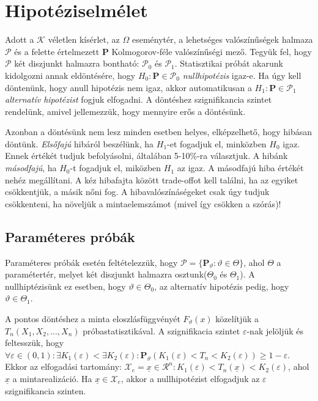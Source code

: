 \chapter{Hipotéziselmélet}

Adott a $\mathcal{K}$ véletlen kísérlet, az $\Omega$ eseménytér,  a lehetséges valószínűségek halmaza $\mathcal{P}$ és a felette értelmezett $\mathbf{P}$ Kolmogorov-féle valószínűségi mező. Tegyük fel, hogy $\mathcal{P}$ két diszjunkt halmazra bontható: $\mathcal{P}_0$ és $\mathcal{P}_1$. Statisztikai próbát akarunk kidolgozni annak eldöntésére, hogy $H_0:\mathbf{P}\in\mathcal{P}_0$ \emph{nullhipotézis} igaz-e. Ha úgy kell döntenünk, hogy anull hipotézis nem igaz, akkor automatikusan a $H_1:\mathbf{P}\in\mathcal{P}_1$ \emph{alternatív hipotézist} fogjuk elfogadni. A döntéshez szignifikancia szintet rendelünk, amivel jellemezzük, hogy mennyire erős a döntésünk.

Azonban a döntésünk nem lesz minden esetben helyes, elképzelhető, hogy hibásan döntünk. \emph{Elsőfajú} hibáról beszélünk, ha $H_1$-et fogadjuk el, minközben $H_0$ igaz. Ennek értékét tudjuk befolyásolni, általában 5-10\%-ra választjuk. A hibánk \emph{másodfajú}, ha $H_0$-t fogadjuk el, miközben $H_1$ az igaz. A másodfajú hiba értékét nehéz megállítani. A kéz hibafajta között trade-offot kell találni, ha az egyiket csökkentjük, a másik nőni fog. A hibavalószínáségeket csak úgy tudjuk csökkenteni, ha növeljük a mintaelemszámot (mivel így csökken a szórás)!

\section{Paraméteres próbák}

Paraméteres próbák esetén feltételezzük, hogy $\mathcal{P} = \{\mathbf{P}_\vartheta:\vartheta \in \Theta\}$, ahol $\Theta$ a paramétertér, melyet két diszjunkt halmazra osztunk($\Theta_0$ és $\Theta_1$). A nullhiptézisünk ez esetben, hogy $\vartheta \in \Theta_0$, az alternatív hipotézis pedig, hogy $\vartheta \in \Theta_1$.

A pontos döntéshez  a minta eloszlásfüggvényét $F_\vartheta(x)$ közelítjük a $T_n(X_1,X_2,...,X_n)$ próbastatisztikával. A szignifikacia szintet $\varepsilon$-nak jelöljük és feltesszük, hogy $\forall \varepsilon \in (0,1): \exists K_1(\varepsilon) < \exists K_2(\varepsilon): \mathbf{P}_\vartheta(K_1(\varepsilon) < T_n <K_2(\varepsilon)) \geq 1-\varepsilon$. Ekkor az elfogadási tartomány: $\mathcal{X}_e={\underline{x}\in\mathcal{R}^n: K_1(\varepsilon) < T_n(\underline{x}) <K_2(\varepsilon)}$, ahol $\underline{x}$ a mintarealizáció. Ha $\underline{x} \in \mathcal{X}_e$, akkor a nullhipotézist elfogadjuk az $\varepsilon$ szignifikancia szinten.

